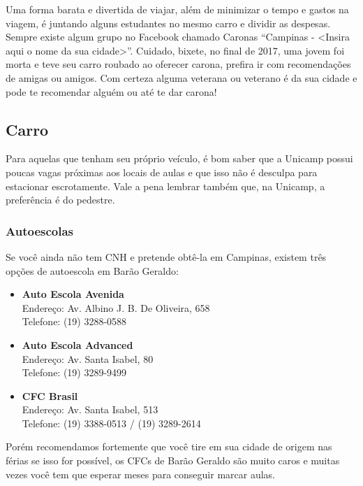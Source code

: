 Uma forma barata e divertida de viajar, além de minimizar o tempo e gastos na
viagem, é juntando alguns estudantes no mesmo carro e dividir as despesas.
Sempre existe algum grupo no Facebook chamado Caronas ``Campinas - <Insira aqui
o nome da sua cidade>''. Cuidado, bixete, no final de 2017, uma jovem foi morta
e teve seu carro roubado ao oferecer carona, prefira ir com recomendações de
amigas ou amigos. Com certeza alguma veterana ou veterano é da sua cidade e
pode te recomendar alguém ou até te dar carona!

\subsection{Carro}

Para aquelas que tenham seu próprio veículo, é bom saber que a Unicamp possui
poucas vagas próximas aos locais de aulas e que isso não é desculpa para
estacionar escrotamente. Vale a pena lembrar também que, na Unicamp, a
preferência é do pedestre.

\subsubsection{Autoescolas}

Se você ainda não tem CNH e pretende obtê-la em Campinas, existem três opções
de autoescola em Barão Geraldo:

\begin{itemize}
    \item \textbf{Auto Escola Avenida}
        \\Endereço: Av. Albino J. B. De Oliveira, 658
        \\Telefone: (19) 3288-0588

    \item \textbf{Auto Escola Advanced}
        \\Endereço: Av. Santa Isabel, 80
        \\Telefone: (19) 3289-9499

    \item \textbf{CFC Brasil}
        \\Endereço: Av. Santa Isabel, 513
        \\Telefone: (19) 3388-0513 / (19) 3289-2614
\end{itemize}

Porém recomendamos fortemente que você tire em sua cidade de origem nas férias
se isso for possível, os CFCs de Barão Geraldo são muito caros e muitas vezes
você tem que esperar meses para conseguir marcar aulas.

